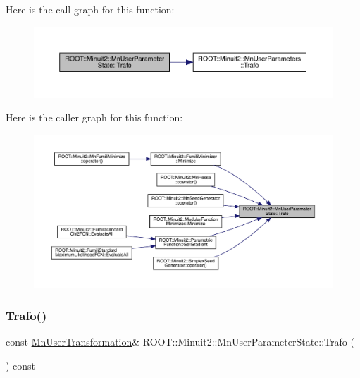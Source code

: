 Here is the call graph for this function\+:
\nopagebreak
\begin{figure}[H]
\begin{center}
\leavevmode
\includegraphics[width=350pt]{d3/de0/classROOT_1_1Minuit2_1_1MnUserParameterState_a7184e94a20e923d68f1fb00ab5c549b2_cgraph}
\end{center}
\end{figure}
Here is the caller graph for this function\+:\nopagebreak
\begin{figure}[H]
\begin{center}
\leavevmode
\includegraphics[width=350pt]{d3/de0/classROOT_1_1Minuit2_1_1MnUserParameterState_a7184e94a20e923d68f1fb00ab5c549b2_icgraph}
\end{center}
\end{figure}
\mbox{\label{classROOT_1_1Minuit2_1_1MnUserParameterState_a7184e94a20e923d68f1fb00ab5c549b2}} 
\subsubsection{\texorpdfstring{Trafo()}{Trafo()}\hspace{0.1cm}{\footnotesize\ttfamily [2/2]}}
{\footnotesize\ttfamily const \mbox{\hyperlink{classROOT_1_1Minuit2_1_1MnUserTransformation}{Mn\+User\+Transformation}}\& R\+O\+O\+T\+::\+Minuit2\+::\+Mn\+User\+Parameter\+State\+::\+Trafo (\begin{DoxyParamCaption}{ }\end{DoxyParamCaption}) const\hspace{0.3cm}{\ttfamily [inline]}}


